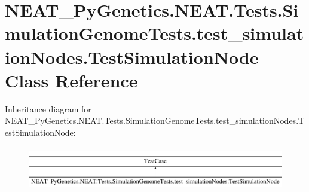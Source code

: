 \hypertarget{class_n_e_a_t___py_genetics_1_1_n_e_a_t_1_1_tests_1_1_simulation_genome_tests_1_1test__simulatiod8e854bf66539833796699d238a883fa}{}\section{N\+E\+A\+T\+\_\+\+Py\+Genetics.\+N\+E\+A\+T.\+Tests.\+Simulation\+Genome\+Tests.\+test\+\_\+simulation\+Nodes.\+Test\+Simulation\+Node Class Reference}
\label{class_n_e_a_t___py_genetics_1_1_n_e_a_t_1_1_tests_1_1_simulation_genome_tests_1_1test__simulatiod8e854bf66539833796699d238a883fa}
Inheritance diagram for N\+E\+A\+T\+\_\+\+Py\+Genetics.\+N\+E\+A\+T.\+Tests.\+Simulation\+Genome\+Tests.\+test\+\_\+simulation\+Nodes.\+Test\+Simulation\+Node\+:\begin{figure}[H]
\begin{center}
\leavevmode
\includegraphics[height=1.982301cm]{class_n_e_a_t___py_genetics_1_1_n_e_a_t_1_1_tests_1_1_simulation_genome_tests_1_1test__simulatiod8e854bf66539833796699d238a883fa}
\end{center}
\end{figure}
